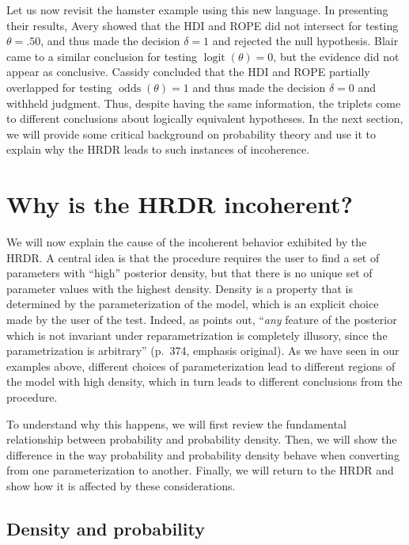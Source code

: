 \documentclass[9pt,twocolumn,twoside]{cidlab-draft}\templatetype{cidlab-invited}
\newcommand{\hdr}{HRDR}
\DeclareMathOperator*{\oddss}{odds}
\DeclareMathOperator*{\logit}{logit}
\begin{document}
Let us now revisit the hamster example using this new language. In presenting their results, Avery showed that the HDI and ROPE did not intersect for testing $\theta=.50$, and thus made the decision $\delta=1$ and rejected the null hypothesis. Blair came to a similar conclusion for testing $\logit(\theta)=0$, but the evidence did not appear as conclusive. Cassidy concluded that the HDI and ROPE partially overlapped for testing $\oddss(\theta)=1$ and thus made the decision $\delta=0$ and withheld judgment. Thus, despite having the same information, the triplets come to different conclusions about logically equivalent hypotheses. In the next section, we will provide some critical background on probability theory and use it to explain why the \hdr{} leads to such instances of incoherence. 

\section*{Why is the \hdr{} incoherent?}

We will now explain the cause of the incoherent behavior exhibited by the \hdr{}. A central idea is that the procedure requires the user to find a set of parameters with ``high'' posterior density, but that there is no unique set of parameter values with the highest density. Density is a property that is determined by the parameterization of the model, which is an explicit choice made by the user of the test. 
Indeed, as  points out, ``\textit{any} feature of the posterior which is not invariant under reparametrization is completely illusory, since the parametrization is arbitrary'' (p.~374, emphasis original).
As we have seen in our examples above, different choices of parameterization lead to different regions of the model with high density, which in turn leads to different conclusions from the procedure.

To understand why this happens, we will first review the fundamental relationship between probability and probability density. Then, we will show the difference in the way probability and probability density behave when converting from one parameterization to another. Finally, we will return to the \hdr{} and show how it is affected by these considerations.  
    
\subsection*{Density and probability}
\end{document}
